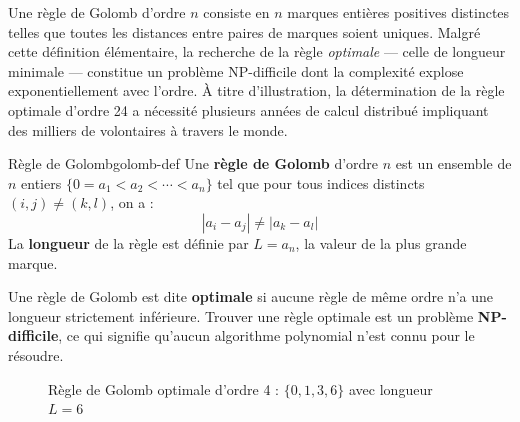 \documentclass[12pt,a4paper,twoside]{report}
\begin{document}
Une règle de Golomb d'ordre $n$ consiste en $n$ marques entières positives distinctes telles que toutes les distances entre paires de marques soient uniques. Malgré cette définition élémentaire, la recherche de la règle \textit{optimale} --- celle de longueur minimale --- constitue un problème NP-difficile dont la complexité explose exponentiellement avec l'ordre. À titre d'illustration, la détermination de la règle optimale d'ordre 24 a nécessité plusieurs années de calcul distribué impliquant des milliers de volontaires à travers le monde.

\begin{definition}{Règle de Golomb}{golomb-def}
Une \textbf{règle de Golomb} d'ordre $n$ est un ensemble de $n$ entiers $\{0 = a_1 < a_2 < \cdots < a_n\}$ tel que pour tous indices distincts $(i,j) \neq (k,l)$, on a :
\[
|a_i - a_j| \neq |a_k - a_l|
\]
La \textbf{longueur} de la règle est définie par $L = a_n$, la valeur de la plus grande marque.
\end{definition}

Une règle de Golomb est dite \textbf{optimale} si aucune règle de même ordre n'a une longueur strictement inférieure. Trouver une règle optimale est un problème \textbf{NP-difficile}, ce qui signifie qu'aucun algorithme polynomial n'est connu pour le résoudre.

\begin{figure}[htbp]
\centering
{}
\caption{Règle de Golomb optimale d'ordre 4 : $\{0, 1, 3, 6\}$ avec longueur $L=6$}
\label{fig:golomb-g4}
\end{figure}
\end{document}
